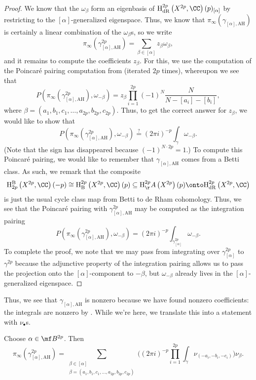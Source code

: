 \documentclass[../thesis.tex]{subfiles}
\begin{document}
\begin{proof}
	We know that the $\omega_{\beta}$ form an eigenbasis of $\mathrm H^{2p}_{\mathrm{dR}}\left(X^{2p},\CC\right)(p)_{[\alpha]}$ by restricting  to the $[\alpha]$-generalized eigenspace. Thus, we know that $\pi_\infty(\gamma_{[\alpha],\mathrm{AH}})$ is certainly a linear combination of the $\omega_\beta$s, so we write
	\[\pi_\infty\left(\gamma_{[\alpha],\mathrm{AH}}^{2p}\right)=\sum_{\beta\in[\alpha]}z_\beta\omega_\beta,\]
	and it remains to compute the coefficients $z_\beta$. For this, we use the computation of the Poincar\'e pairing computation from  (iterated $2p$ times), whereupon we see that
	\[P\left(\pi_\infty\left(\gamma_{[\alpha],\mathrm{AH}}^{2p}\right),\omega_{-\beta}\right)=z_\beta\prod_{i=1}^{2p}(-1)^N\frac N{N-[a_i]-[b_i]},\]
	where $\beta=(a_1,b_1,c_1,\ldots,a_{2p},b_{2p},c_{2p})$. Thus, to get the correct answer for $z_\beta$, we would like to show that
	\[P\left(\pi_\infty\left(\gamma_{[\alpha],\mathrm{AH}}^{2p}\right),\omega_{-\beta}\right)\stackrel?=(2\pi i)^{-p}\int_\gamma\omega_{-\beta}.\]
	(Note that the sign has disappeared because $(-1)^{N\cdot2p}=1$.) To compute this Poincar\'e pairing, we would like to remember that $\gamma_{[\alpha],\mathrm{AH}}$ comes from a Betti class. As such, we remark that the composite
	\[\mathrm H^{\mathrm B}_{2p}\left(X^{2p},\CC\right)(-p)\cong\mathrm H_{\mathrm B}^{2p}\left(X^{2p},\CC\right)(p)\subseteq\mathrm H^{2p}_\AA\left(X^{2p}\right)(p)\onto\mathrm H^{2p}_{\mathrm{dR}}\left(X^{2p},\CC\right)\]
	is just the usual cycle class map from Betti to de Rham cohomology. Thus, we see that the Poincar\'e pairing with $\gamma_{[\alpha],\mathrm{AH}}^{2p}$ may be computed as the integration pairing
	\[P\left(\pi_\infty\left(\gamma_{[\alpha],\mathrm{AH}}^{2p}\right),\omega_{-\beta}\right)=(2\pi i)^{-p}\int_{\gamma_{[\alpha]}^{2p}}\omega_{-\beta}.\]
	To complete the proof, we note that we may pass from integrating over $\gamma_{[\alpha]}^{2p}$ to $\gamma^{2p}$ because the adjunctive property of the integration pairing allows us to pass the projection onto the $[\alpha]$-component to $-\beta$, but $\omega_{-\beta}$ already lives in the $[\alpha]$-generalized eigenspace.
\end{proof}
Thus, we see that $\gamma_{[\alpha],\mathrm{AH}}$ is nonzero because we have found nonzero coefficients: the integrals are nonzero by . While we're here, we translate this into a statement with $\nu_\bullet$s.
\begin{corollary} \label{cor:fermat-abs-hodge-to-coleman-hodge}
	Choose $\alpha\in\mf B^{2p}$. Then
	\[\pi_\infty\left(\gamma_{[\alpha],\mathrm{AH}}^{2p}\right)=\sum_{\substack{\beta\in[\alpha]\\\beta=(a_1,b_1,c_1,\ldots,a_{2p},b_{2p},c_{2p})}}\Bigg((2\pi i)^{-p}\prod_{i=1}^{2p}\int_{\gamma}\nu_{(-a_i,-b_i,-c_i)}\Bigg)\nu_{\beta}.\]
\end{corollary}
\end{document}
